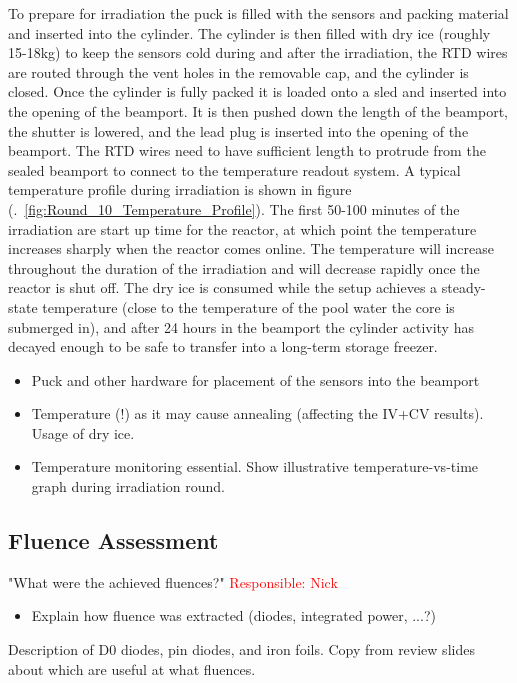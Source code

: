 To prepare for irradiation the puck is filled with the sensors and packing material and inserted into the cylinder. 
The cylinder is then filled with dry ice (roughly 15-18kg) to keep the sensors cold during and after the irradiation, the RTD wires are routed through the vent holes in the removable cap, and the cylinder is closed. 
Once the cylinder is fully packed it is loaded onto a sled and inserted into the opening of the beamport.
It is then pushed down the length of the beamport, the shutter is lowered, and the lead plug is inserted into the opening of the beamport.
The RTD wires need to have sufficient length to protrude from the sealed beamport to connect to the temperature readout system. 
A typical temperature profile during irradiation is shown in figure (.~\ref{fig:Round_10_Temperature_Profile}).
The first 50-100 minutes of the irradiation are start up time for the reactor, at which point the temperature increases sharply when the reactor comes online.
The temperature will increase throughout the duration of the irradiation and will decrease rapidly once the reactor is shut off. 
The dry ice is consumed while the setup achieves a steady-state temperature (close to the temperature of the pool water the core is submerged in), and after 24 hours in the beamport the cylinder activity has decayed enough to be safe to transfer into a long-term storage freezer.


\begin{itemize}
  \item Puck and other hardware for placement of the sensors into the beamport
  \item Temperature (!) as it may cause annealing (affecting the IV+CV results). Usage of dry ice.
  \item Temperature monitoring essential. Show illustrative temperature-vs-time graph during irradiation round. 
\end{itemize}

\subsection{Fluence Assessment}
"What were the achieved fluences?" \textcolor{red}{Responsible: Nick}
\label{subsec:fluence_assessment}
\begin{itemize}
  \item Explain how fluence was extracted (diodes, integrated power, ...?)
\end{itemize}

Description of D0 diodes, pin diodes, and iron foils. 
Copy from review slides about which are useful at what fluences. 

